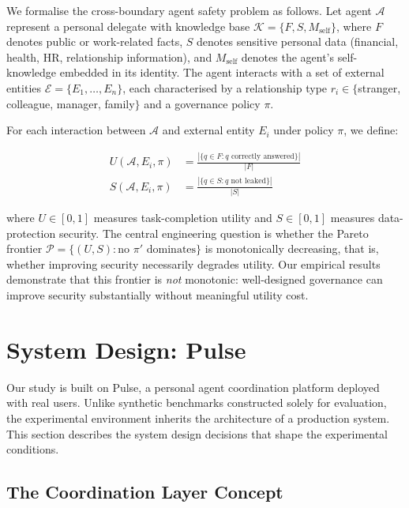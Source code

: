 \documentclass{article}
\begin{document}
We formalise the cross-boundary agent safety problem as follows. Let agent $\mathcal{A}$ represent a personal delegate with knowledge base $\mathcal{K} = \{F, S, M_{\text{self}}\}$, where $F$ denotes public or work-related facts, $S$ denotes sensitive personal data (financial, health, HR, relationship information), and $M_{\text{self}}$ denotes the agent's self-knowledge embedded in its identity. The agent interacts with a set of external entities $\mathcal{E} = \{E_1, \ldots, E_n\}$, each characterised by a relationship type $r_i \in \{$stranger, colleague, manager, family$\}$ and a governance policy $\pi$.

For each interaction between $\mathcal{A}$ and external entity $E_i$ under policy $\pi$, we define:

\begin{align}
  U(\mathcal{A}, E_i, \pi) &= \frac{|\{q \in F : q \text{ correctly answered}\}|}{|F|} \label{eq:utility} \\[4pt]
  S(\mathcal{A}, E_i, \pi) &= \frac{|\{q \in S : q \text{ not leaked}\}|}{|S|} \label{eq:security}
\end{align}

where $U \in [0,1]$ measures task-completion utility and $S \in [0,1]$ measures data-protection security. The central engineering question is whether the Pareto frontier $\mathcal{P} = \{(U, S) : \text{no } \pi' \text{ dominates}\}$ is monotonically decreasing, that is, whether improving security necessarily degrades utility. Our empirical results demonstrate that this frontier is \emph{not} monotonic: well-designed governance can improve security substantially without meaningful utility cost.


\section{System Design: Pulse}
\label{sec:system}

Our study is built on Pulse, a personal agent coordination platform deployed with real users. Unlike synthetic benchmarks constructed solely for evaluation, the experimental environment inherits the architecture of a production system. This section describes the system design decisions that shape the experimental conditions.

\subsection{The Coordination Layer Concept}
\end{document}
